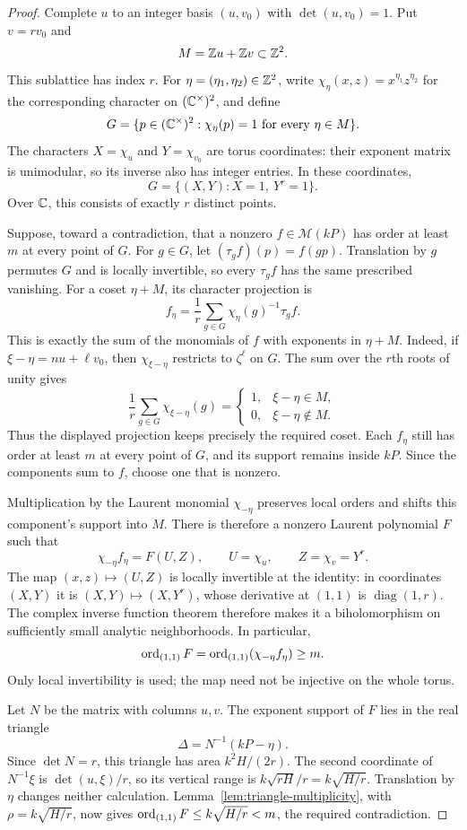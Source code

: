 \begin{proof}
Complete $u$ to an integer basis $(u,v_0)$ with $\det(u,v_0)=1$.
Put $v=rv_0$ and
\[
 M=\mathbb Z u+\mathbb Z v\subset\mathbb Z^2.
\]
This sublattice has index $r$.  For $\eta=(\eta_1,\eta_2)\in\mathbb Z^2$,
write $\chi_\eta(x,z)=x^{\eta_1}z^{\eta_2}$ for the corresponding
character on $(\mathbb C^\times)^2$, and define
\[
 G=\{p\in(\mathbb C^\times)^2:\chi_\eta(p)=1\text{ for every }\eta\in M\}.
\]
The characters $X=\chi_u$ and $Y=\chi_{v_0}$ are torus coordinates:
their exponent matrix is unimodular, so its inverse also has integer
entries.  In these coordinates,
\[
 G=\{(X,Y):X=1,\ Y^r=1\}.
\]
Over $\mathbb C$, this consists of exactly $r$ distinct points.

Suppose, toward a contradiction, that a nonzero
$f\in\mathcal M(kP)$ has order at least $m$ at every point of $G$.
For $g\in G$, let $(\tau_gf)(p)=f(gp)$.  Translation by $g$ permutes
$G$ and is locally invertible, so every $\tau_gf$ has the same prescribed
vanishing.  For a coset $\eta+M$, its character projection is
\[
 f_\eta=\frac1r\sum_{g\in G}\chi_\eta(g)^{-1}\tau_gf.
\]
This is exactly the sum of the monomials of $f$ with exponents in
$\eta+M$.  Indeed, if $\xi-\eta=n u+\ell v_0$, then
$\chi_{\xi-\eta}$ restricts to $\zeta^\ell$ on $G$.  The sum over the
$r$th roots of unity gives
\[
 \frac1r\sum_{g\in G}\chi_{\xi-\eta}(g)
 =\begin{cases}
 1,&\xi-\eta\in M,\\
 0,&\xi-\eta\notin M.
 \end{cases}
\]
Thus the displayed projection keeps precisely the required coset.
Each $f_\eta$ still has order at least $m$ at every point of $G$, and its
support remains inside $kP$.  Since the components sum to $f$, choose
one that is nonzero.

Multiplication by the Laurent monomial $\chi_{-\eta}$ preserves local
orders and shifts this component's support into $M$.  There is therefore
a nonzero Laurent polynomial $F$ such that
\[
 \chi_{-\eta}f_\eta=F(U,Z),
 \qquad U=\chi_u,
 \qquad Z=\chi_v=Y^r.
\]
The map $(x,z)\mapsto(U,Z)$ is locally invertible at the identity:
in coordinates $(X,Y)$ it is $(X,Y)\mapsto(X,Y^r)$, whose derivative at
$(1,1)$ is $\operatorname{diag}(1,r)$.  The complex inverse function theorem therefore makes it a biholomorphism
on sufficiently small analytic neighborhoods.  In particular,
\[
 \operatorname{ord}_{(1,1)}F
 =\operatorname{ord}_{(1,1)}(\chi_{-\eta}f_\eta)\geq m.
\]
Only local invertibility is used; the map need not be injective on the
whole torus.

Let $N$ be the matrix with columns $u,v$.  The exponent support of $F$
lies in the real triangle
\[
 \Delta=N^{-1}(kP-\eta).
\]
Since $\det N=r$, this triangle has area $k^2H/(2r)$.  The second
coordinate of $N^{-1}\xi$ is $\det(u,\xi)/r$, so its vertical range is
$k\sqrt{rH}/r=k\sqrt{H/r}$.  Translation by $\eta$ changes neither
calculation.  Lemma~\ref{lem:triangle-multiplicity}, with
$\rho=k\sqrt{H/r}$, now gives
$\operatorname{ord}_{(1,1)}F\leq k\sqrt{H/r}<m$, the required contradiction.
\end{proof}

